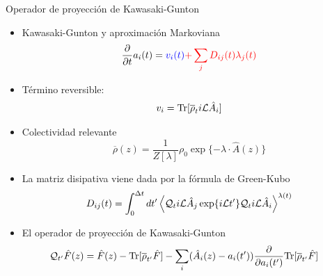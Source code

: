 \documentclass{beamer}
\begin{document}
\begin{frame}{Operador de proyección de Kawasaki-Gunton}
  \begin{itemize}
    \item<1-> Kawasaki-Gunton y aproximación Markoviana 
\begin{equation}
  \frac{\partial}{\partial t}a_i(t) = {\color{blue} v_i(t)} {\color{red} +\sum_j D_{ij}(t) \lambda_j(t)}
\nonumber
\end{equation}
\item<2-> {\color{blue} Término reversible}: 
  \begin{align}
    v_i={\rm Tr}[\overline{\rho}_t i{\cal L}\hat{A}_i] 
    \nonumber
  \end{align}
\item<3-> Colectividad relevante 
  \begin{equation}
  \overline{\rho}(z) = \frac{1}{Z[\lambda]} \rho_0\exp\{-\lambda\!\cdot\!\hat{A}(z)\}
  \nonumber
  \end{equation}
\item<4-> {\color{red} La matriz disipativa} viene dada por la fórmula de  Green-Kubo
\begin{equation}
D_{ij}(t)=\int_0^{\Delta t} dt'\left\langle 
{\cal Q}_t i{\cal L}\hat{A}_j\exp\{i{\cal L}t'\}{\cal Q}_t i{\cal L}\hat{A}_i
\right\rangle^{\lambda(t)}
\label{dij}
\nonumber
\end{equation}
\item<5-> El operador de proyección de Kawasaki-Gunton  
  \begin{align}
    {\cal Q}_{t'}\hat{F}(z) &= \hat{F}(z)- {\rm Tr}[\overline{\rho}_{t'} \hat{F}]
  -\sum_i(\hat{A}_i(z)-a_i(t'))\frac{\partial }{\partial a_i(t')}
  {\rm Tr}[\overline{\rho}_{t'} \hat{F}]
  \label{Q}
  \nonumber
  \end{align}
\end{itemize}
\end{frame}
\end{document}

